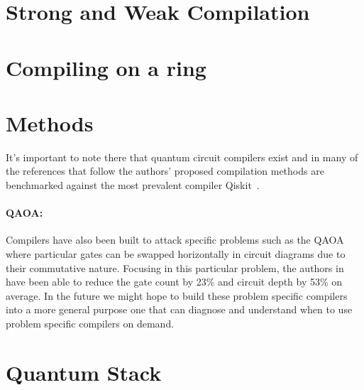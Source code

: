 \section{Strong and Weak Compilation}

\section{Compiling on a ring}

\section{Methods}

It's important to note there that quantum circuit compilers exist and in many of the references that follow the authors' proposed compilation methods are benchmarked against the most prevalent compiler Qiskit~\cite{qiskit}.

\paragraph{QAOA:}
Compilers have also been built to attack specific problems such as the \ac{QAOA}~\cite{qaoa} where particular gates can be swapped horizontally in circuit diagrams due to their commutative nature.
Focusing in this particular problem, the authors in~\cite{qaoa-compiler} have been able to reduce the gate count by 23\% and circuit depth by 53\% on average.
In the future we might hope to build these problem specific compilers into a more general purpose one that can diagnose and understand when to use problem specific compilers on demand.

\section{Quantum Stack}
